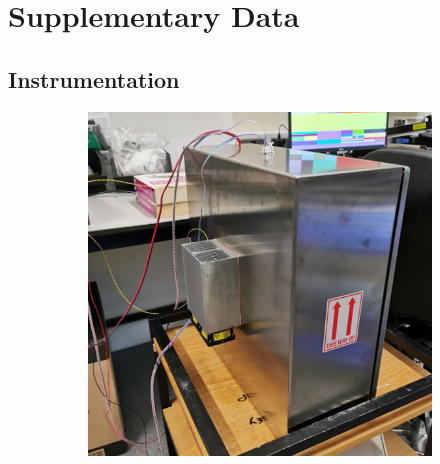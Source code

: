 \ifpdf
    \graphicspath{{Appendix1/Figs/Raster/}{Appendix1/Figs/PDF/}{Appendix1/Figs/}}
\else
    \graphicspath{{Appendix1/Figs/Vector/}{Appendix1/Figs/}}
\fi

\chapter{Supplementary Data} 
\section*{Instrumentation}
\begin{figure}
    \begin{subfigure}{0.49\textwidth}
        \includegraphics[width=\textwidth]{enclosure_back}
    \end{subfigure}
    \hspace*{\fill}
    \begin{subfigure}{0.49\textwidth}

\end{subfigure}
\end{figure}
